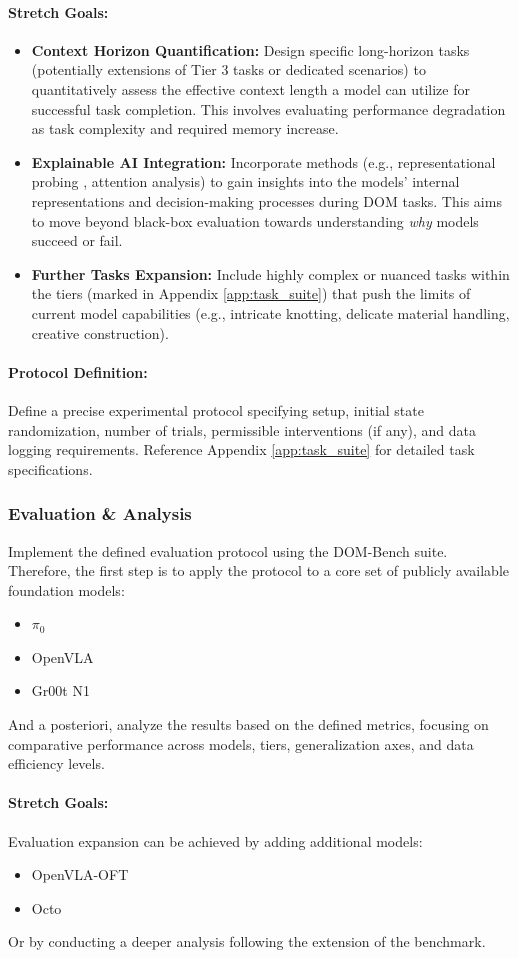 \paragraph{Stretch Goals:}
\begin{itemize}
    \item \textbf{Context Horizon Quantification:} Design specific long-horizon tasks (potentially extensions of Tier 3 tasks or dedicated scenarios) to quantitatively assess the effective context length a model can utilize for successful task completion. This involves evaluating performance degradation as task complexity and required memory increase.
    \item \textbf{Explainable AI Integration:} Incorporate methods (e.g., representational probing \cite{Probing-VLA}, attention analysis) to gain insights into the models' internal representations and decision-making processes during DOM tasks. This aims to move beyond black-box evaluation towards understanding \textit{why} models succeed or fail.
    \item \textbf{Further Tasks Expansion:} Include highly complex or nuanced tasks within the tiers (marked in Appendix \ref{app:task_suite}) that push the limits of current model capabilities (e.g., intricate knotting, delicate material handling, creative construction).
\end{itemize}

\paragraph{Protocol Definition:} Define a precise experimental protocol specifying setup, initial state randomization, number of trials, permissible interventions (if any), and data logging requirements. Reference Appendix \ref{app:task_suite} for detailed task specifications.

\subsubsection{Evaluation \& Analysis}
Implement the defined evaluation protocol using the DOM-Bench suite. Therefore, the first step is to apply the protocol to a core set of publicly available foundation models:
\begin{itemize}
    \item $\pi_0$ \cite{pi_zero}
    \item OpenVLA \cite{OpenVLA}
    \item Gr00t N1 \cite{Gr00tN1}
\end{itemize}
And a posteriori, analyze the results based on the defined metrics, focusing on comparative performance across models, tiers, generalization axes, and data efficiency levels.

\paragraph{Stretch Goals:}
Evaluation expansion can be achieved by adding additional models:
    \begin{itemize}
        \item OpenVLA-OFT \cite{OpenVLA-OFT}
        \item Octo \cite{Octo}
    \end{itemize}
Or by conducting a deeper analysis following the extension of the benchmark.


